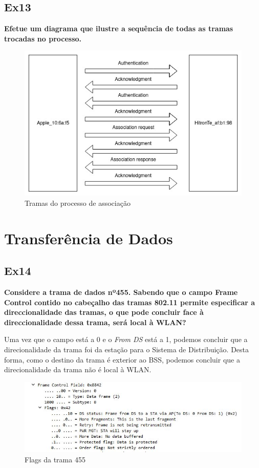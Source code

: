 \documentclass{article}
\begin{document}
\newpage
\subsection{Ex13}
\textbf{Efetue um diagrama que ilustre a sequência de todas as tramas trocadas no processo.}\\\par

\begin{figure}[h]
	\centering
	\includegraphics[scale = 0.6]{diagrama-ex13.jpeg}
	\caption{Tramas do processo de associação}
\end{figure}


\section{Transferência de Dados}
\subsection{Ex14}
\textbf{Considere a trama de dados nº455. Sabendo que o campo Frame Control contido no cabeçalho das tramas 802.11 permite especificar a direccionalidade das tramas, o que pode concluir face à direccionalidade dessa trama, será local à WLAN?}\\\par
Uma vez que o campo  está a 0 e o \textit{From DS} está a 1, podemos concluir que a direcionalidade da trama foi da estação para o Sistema de Distribuição. Desta forma, como o destino da trama é exterior ao BSS, podemos concluir que a direcionalidade da trama não é local à WLAN. 
\begin{figure}[h]
	\centering
	\includegraphics[scale = 0.6]{ex-14.JPG}
	\caption{Flags da trama 455}
\end{figure}
\end{document}
